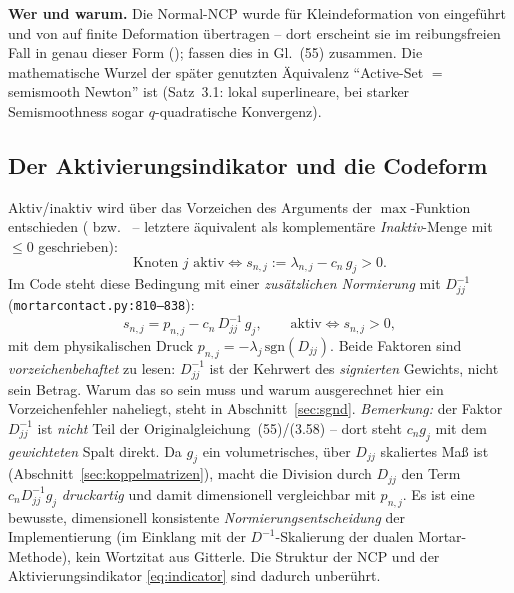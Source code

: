 \documentclass[a4paper,11pt]{article}
\def\tilde#1{#1}%
\newcommand{\file}[1]{\texttt{\small #1}}
\begin{document}
\medskip
\noindent\textbf{Wer und warum.} Die Normal-NCP wurde für Kleindeformation von
\citet{hueber2005} eingeführt und von \citet{poppgeewall2009} auf
finite Deformation übertragen -- dort erscheint sie im reibungsfreien Fall in genau dieser Form
(\citealp[Gl.~(56)]{poppgeewall2009}); \citet{gitterle} fassen dies in Gl.~(55) zusammen. Die
mathematische Wurzel der später genutzten Äquivalenz ``Active-Set $=$ semismooth Newton'' ist
\citet{hik2002} (Satz~3.1: lokal superlineare, bei starker
Semismoothness sogar $q$-quadratische Konvergenz).

\subsection{Der Aktivierungsindikator und die Codeform}
Aktiv/inaktiv wird über das Vorzeichen des Arguments der $\max$-Funktion entschieden
(\citealt[Gl.~(3.13)]{hueber2005} bzw.\ \citealt[Gl.~(70)]{gitterle} -- letztere äquivalent als komplementäre \emph{Inaktiv}-Menge mit $\le 0$ geschrieben):
\begin{equation}
\text{Knoten } j \text{ aktiv} \iff s_{n,j} := \lambda_{n,j} - c_n\,\tilde g_{j} > 0 .
\label{eq:indicator}
\end{equation}
Im Code steht diese Bedingung mit einer \emph{zusätzlichen Normierung} mit $\tilde D_{jj}^{-1}$
(\file{mortarcontact.py:\allowbreak{}810--838}):
\begin{equation}
s_{n,j} = p_{n,j} - c_n\,\tilde D_{jj}^{-1}\,\tilde g_{j},
\qquad \text{aktiv} \iff s_{n,j}>0,
\label{eq:indicator_code}
\end{equation}
mit dem physikalischen Druck $p_{n,j}=-\lambda_j\,\mathrm{sgn}(\tilde D_{jj})$. Beide Faktoren sind
\emph{vorzeichenbehaftet} zu lesen: $\tilde D_{jj}^{-1}$ ist der Kehrwert des \emph{signierten}
Gewichts, nicht sein Betrag. Warum das so sein muss und warum ausgerechnet hier ein Vorzeichenfehler
naheliegt, steht in Abschnitt~\ref{sec:sgnd}. \emph{Bemerkung:} der
Faktor $\tilde D_{jj}^{-1}$ ist \emph{nicht} Teil der Originalgleichung~(55)/(3.58) -- dort steht
$c_n\tilde g_j$ mit dem \emph{gewichteten} Spalt direkt. Da $\tilde g_j$ ein volumetrisches,
über $\tilde D_{jj}$ skaliertes Maß ist (Abschnitt~\ref{sec:koppelmatrizen}), macht die Division
durch $\tilde D_{jj}$ den Term $c_n\tilde D_{jj}^{-1}\tilde g_j$ \emph{druckartig} und damit
dimensionell vergleichbar mit $p_{n,j}$. Es ist eine bewusste, dimensionell konsistente
\emph{Normierungsentscheidung} der Implementierung (im Einklang mit der $D^{-1}$-Skalierung der
dualen Mortar-Methode), kein Wortzitat aus Gitterle. Die Struktur der NCP und der
Aktivierungsindikator \eqref{eq:indicator} sind dadurch unberührt.
\end{document}
